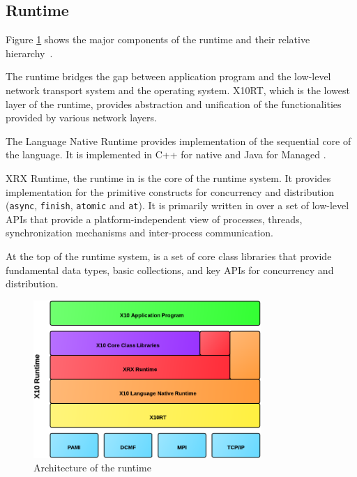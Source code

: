 \subsection{\xten Runtime}
Figure \ref{fig:x10runtime} shows the major components of the \xten runtime and
their relative hierarchy~\cite{x10intro}. 

The runtime bridges the gap between 
application program and
the low-level network transport system and the operating system. X10RT, which is
the lowest layer of the \xten runtime, provides abstraction and unification of
the functionalities provided by various network layers. 

The \xten Language
Native Runtime provides implementation of the sequential core of the language.
It is implemented in C++ for native \xten and Java for Managed \xten. 

XRX Runtime, the \xten runtime in \xten is the core of the \xten runtime system.
It provides implementation for the primitive \xten constructs for concurrency
and distribution (\texttt{async}, \texttt{finish}, \texttt{atomic} and
\texttt{at}). It is primarily written in \xten over a set of low-level APIs that
provide a platform-independent view of processes, threads, synchronization
mechanisms and inter-process communication. 

At the top of the \xten runtime system, is a set of core
class libraries that provide fundamental data types, basic collections, and key
APIs for concurrency and distribution.   

\begin{figure}[htbp]
    \centering
    \includegraphics[width=0.77\textwidth]{Figures/x10rt.pdf}
    \caption{Architecture of the \xten runtime}
    \label{fig:x10runtime}
\end{figure}

%
%
%   
